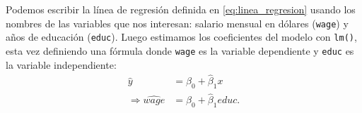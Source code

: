 \documentclass{report}\usepackage[]{graphicx}\usepackage[]{color}
\begin{document}





Podemos escribir la línea de regresión definida en \eqref{eq:linea_regresion} usando los nombres de las variables que nos interesan: salario mensual en dólares (\verb|wage|) y años de educación (\verb|educ|). Luego estimamos los coeficientes del modelo con \verb|lm()|, esta vez definiendo una fórmula donde \verb|wage| es la variable dependiente y \verb|educ| es la variable independiente:
\begin{align*}
\hat y &= \hat\beta_0 + \hat\beta_1 x \\
\Longrightarrow \widehat{wage} &= \hat\beta_0 + \hat\beta_1 {educ}.
\end{align*}
\end{document}
